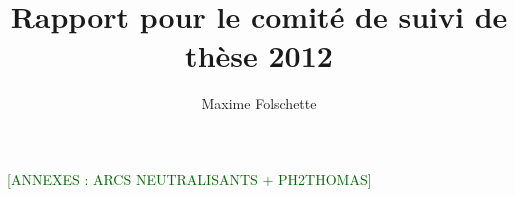 \documentclass[11pt]{report}
\title{Rapport pour le comité de suivi de thèse 2012}
\author{Maxime Folschette}
\newcommand{\todo}[1]{\textcolor{darkgreen}{[#1]}}
\begin{document}
\maketitle

\tableofcontents











\newpage
\todo{ANNEXES : ARCS NEUTRALISANTS + PH2THOMAS}
\end{document}
